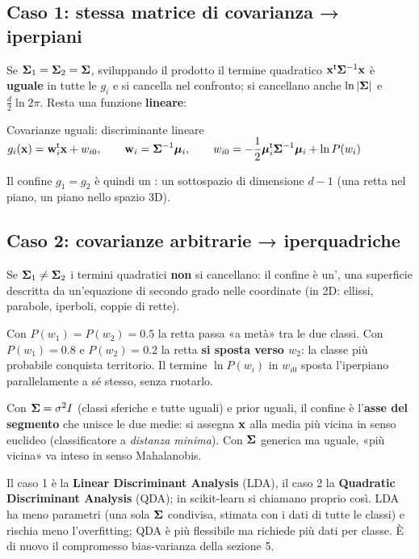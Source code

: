 \subsection{Caso 1: stessa matrice di covarianza → iperpiani}
Se $\bm{\Sigma}_1=\bm{\Sigma}_2=\bm{\Sigma}$, sviluppando il prodotto il termine quadratico $\mathbf{x}^{\mathsf{t}}\bm{\Sigma}^{-1}\mathbf{x}$ è \textbf{uguale} in tutte le $g_i$ e si cancella nel confronto; si cancellano anche $\ln|\bm{\Sigma}|$ e $\frac d2\ln2\pi$. Resta una funzione \textbf{lineare}:
\begin{formulat}{Covarianze uguali: discriminante lineare}
$\displaystyle g_i(\mathbf{x})=\mathbf{w}_i^{\mathsf{t}}\mathbf{x}+w_{i0},\qquad \mathbf{w}_i=\bm{\Sigma}^{-1}\bm{\mu}_i,\qquad w_{i0}=-\frac12\bm{\mu}_i^{\mathsf{t}}\bm{\Sigma}^{-1}\bm{\mu}_i+\ln P(w_i)$
\end{formulat}
Il confine $g_1=g_2$ è quindi un : un sottospazio di dimensione $d-1$ (una retta nel piano, un piano nello spazio 3D).

\subsection{Caso 2: covarianze arbitrarie → iperquadriche}
Se $\bm{\Sigma}_1\neq\bm{\Sigma}_2$ i termini quadratici \textbf{non} si cancellano: il confine è un', una superficie descritta da un'equazione di secondo grado nelle coordinate (in 2D: ellissi, parabole, iperboli, coppie di rette).


\begin{esempio}
Con $P(w_1)=P(w_2)=0.5$ la retta passa «a metà» tra le due classi. Con $P(w_1)=0.8$ e $P(w_2)=0.2$ la retta \textbf{si sposta verso $w_2$}: la classe più probabile conquista territorio. Il termine $\ln P(w_i)$ in $w_{i0}$ sposta l'iperpiano parallelamente a sé stesso, senza ruotarlo.
\end{esempio}
\begin{tecnica}
Con $\bm{\Sigma}=\sigma^2I$ (classi sferiche e tutte uguali) e prior uguali, il confine è l'\textbf{asse del segmento} che unisce le due medie: si assegna $\mathbf{x}$ alla media più vicina in senso euclideo (classificatore a \emph{distanza minima}). Con $\bm{\Sigma}$ generica ma uguale, «più vicina» va inteso in senso Mahalanobis.
\end{tecnica}
\begin{mlbox}
Il caso 1 è la \textbf{Linear Discriminant Analysis} (LDA), il caso 2 la \textbf{Quadratic Discriminant Analysis} (QDA); in scikit-learn si chiamano proprio così. LDA ha meno parametri (una sola $\bm{\Sigma}$ condivisa, stimata con i dati di tutte le classi) e rischia meno l'overfitting; QDA è più flessibile ma richiede più dati per classe. È di nuovo il compromesso bias-varianza della sezione 5.
\end{mlbox}

